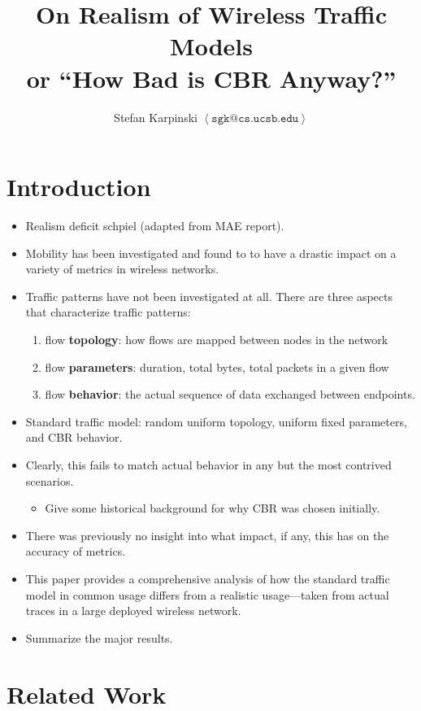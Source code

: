 \documentclass{article}
\title{
On Realism of Wireless Traffic Models\\
{\Large{or ``How Bad is CBR Anyway?''}}
}
\author{
Stefan Karpinski $\left<{\texttt{sgk@cs.ucsb.edu}}\right>$
}
\begin{document}
\maketitle

\section{Introduction}

\begin{itemize}
\item Realism deficit schpiel (adapted from MAE report).
\item Mobility has been investigated and found to to have a drastic impact on a variety of metrics in wireless networks.
\item Traffic patterns have not been investigated at all. There are three aspects that characterize traffic patterns:
\begin{enumerate}
\item flow \textbf{topology}: how flows are mapped between nodes in the network
\item flow \textbf{parameters}: duration, total bytes, total packets in a given flow
\item flow \textbf{behavior}: the actual sequence of data exchanged between endpoints.
\end{enumerate}
\item Standard traffic model: random uniform topology, uniform fixed parameters, and CBR behavior.
\item Clearly, this fails to match actual behavior in any but the most contrived scenarios.
\begin{itemize}
\item Give some historical background for why CBR was chosen initially.
\end{itemize}
\item There was previously no insight into what impact, if any, this has on the accuracy of metrics.
\item This paper provides a comprehensive analysis of how the standard traffic model in common usage differs from a realistic usage---taken from actual traces in a large deployed wireless network.
\item Summarize the major results.
\end{itemize}

\section{Related Work}
\end{document}
